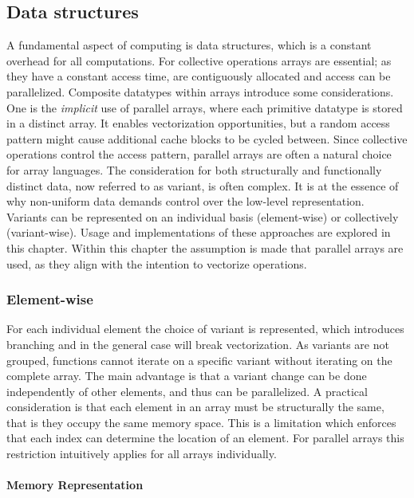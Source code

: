 \documentclass{article}
\begin{document}
\newpage

\subsection{Data structures} \label{data-structures}

A fundamental aspect of computing is data structures, which is a constant overhead for all computations.
For collective operations arrays are essential; as they have a constant access time, are contiguously allocated and access can be parallelized.
Composite datatypes within arrays introduce some considerations.
One is the {\it implicit} use of parallel arrays, where each primitive datatype is stored in a distinct array.
It enables vectorization opportunities, but a random access pattern might cause additional cache blocks to be cycled between.
Since collective operations control the access pattern, parallel arrays are often a natural choice for array languages.
The consideration for both structurally and functionally distinct data, now referred to as variant, is often complex.
It is at the essence of why non-uniform data demands control over the low-level representation.
Variants can be represented on an individual basis (element-wise) or collectively (variant-wise).
Usage and implementations of these approaches are explored in this chapter. 
Within this chapter the assumption is made that parallel arrays are used, as they align with the intention to vectorize operations. 

\subsubsection{Element-wise}\label{element-wise}

For each individual element the choice of variant is represented, which introduces branching and in the general case will break vectorization.
As variants are not grouped, functions cannot iterate on a specific variant without iterating on the complete array.
The main advantage is that a variant change can be done independently of other elements, and thus can be parallelized.
A practical consideration is that each element in an array must be structurally the same, that is they occupy the same memory space.
This is a limitation which enforces that each index can determine the location of an element. 
For parallel arrays this restriction intuitively applies for all arrays individually\cite{accelerate-sum-types}.

\paragraph{Memory Representation}
\end{document}
